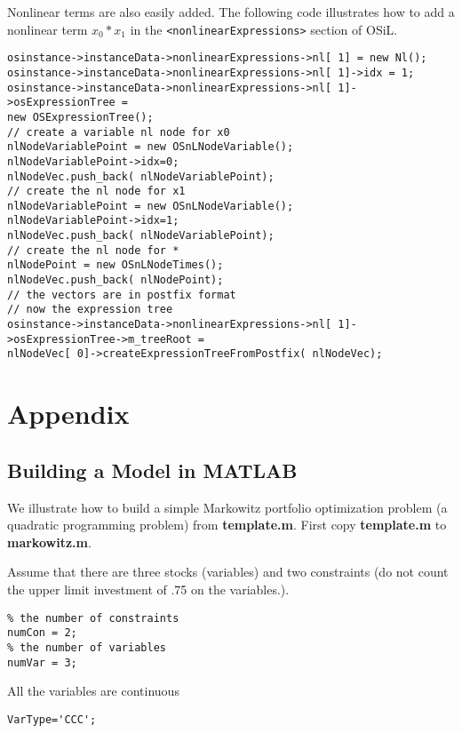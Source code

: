 \documentclass[11pt]{article}
\renewcommand{\_}{{\char"5F}}
\renewcommand{\{}{{\char"7B}}
\renewcommand{\}}{{\char"7D}}
\renewcommand{\^}{{\char"0D}}
\renewcommand{\'}{{\char"0D}}
\begin{document}
Nonlinear terms are also easily added.  The following code illustrates how to add a nonlinear term $x_{0}*x_{1}$ in the {\tt <nonlinearExpressions>} section of  OSiL.
\begin{verbatim}
osinstance->instanceData->nonlinearExpressions->nl[ 1] = new Nl();
osinstance->instanceData->nonlinearExpressions->nl[ 1]->idx = 1;
osinstance->instanceData->nonlinearExpressions->nl[ 1]->osExpressionTree =
new OSExpressionTree();
// create a variable nl node for x0
nlNodeVariablePoint = new OSnLNodeVariable();
nlNodeVariablePoint->idx=0;
nlNodeVec.push_back( nlNodeVariablePoint);
// create the nl node for x1
nlNodeVariablePoint = new OSnLNodeVariable();
nlNodeVariablePoint->idx=1;
nlNodeVec.push_back( nlNodeVariablePoint);
// create the nl node for *
nlNodePoint = new OSnLNodeTimes();
nlNodeVec.push_back( nlNodePoint);
// the vectors are in postfix format
// now the expression tree
osinstance->instanceData->nonlinearExpressions->nl[ 1]->osExpressionTree->m_treeRoot =
nlNodeVec[ 0]->createExpressionTreeFromPostfix( nlNodeVec);
\end{verbatim}



\section{Appendix}\label{section:appendix}


\subsection{Building a Model in MATLAB}

We illustrate how to build a simple Markowitz portfolio optimization problem (a quadratic programming problem) from {\bf template.m}. First copy {\bf template.m} to {\bf markowitz.m}. 

Assume that there are three stocks (variables) and two constraints (do not count the upper limit investment of .75 on the variables.).


\begin{verbatim}
% the number of constraints
numCon = 2;
% the number of variables
numVar = 3;
\end{verbatim}



All the variables are continuous


\begin{verbatim}
VarType='CCC';
\end{verbatim}
\end{document}

